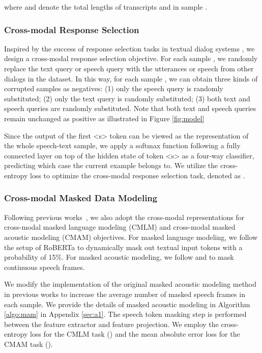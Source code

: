 \documentclass[11pt]{article}
\begin{document}
where  and  denote the total lengths of transcripts  and  in sample .


\subsubsection{Cross-modal Response Selection}
Inspired by the success of response selection tasks in textual dialog systems \citep{bao2019plato}, we design a cross-modal response selection objective. 
For each sample , we randomly replace the text query  or speech query  with the utterances or speech from other dialogs in the dataset.
In this way, for each sample , we can obtain three kinds of corrupted samples as negatives: (1) only the speech query is randomly substituted; (2) only the text query is randomly substituted; (3) both text and speech queries are randomly substituted. Note that both text and speech queries remain unchanged as positive as illustrated in Figure \ref{fig:model} 

Since the output of the first <s> token can be viewed as the representation of the whole speech-text sample, we apply a softmax function following a fully connected layer on top of the hidden state of token <s> as a four-way classifier, predicting which case the current example belongs to. 
We utilize the cross-entropy loss to optimize the cross-modal response selection task, denoted as .




\subsubsection{Cross-modal Masked Data Modeling}
Following previous works~\cite{ctal}, we also adopt the cross-modal representations  for cross-modal masked language modeling (CMLM) and cross-modal masked acoustic modeling (CMAM) objectives. 
For masked language modeling, we follow the setup of RoBERTa \citep{roberta} to dynamically mask out textual input tokens with a probability of 15\%. For masked acoustic modeling, we follow \citet{baevski2020wav2vec} and \citet{Liu_2020} to mask continuous speech frames. 


We modify the implementation of the original masked acoustic modeling method in previous works to increase the average number of masked speech frames in each sample. 
We provide the details of masked acoustic modeling in Algorithm \ref{algo:mam} in Appendix \ref{sec:a1}. 
The speech token masking step is performed between the feature extractor and feature projection. We employ the cross-entropy loss for the CMLM task () and the mean absolute error loss for the CMAM task ().
\end{document}
